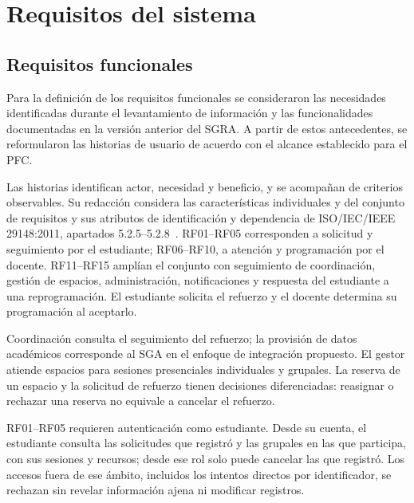 \section{Requisitos del sistema}
\subsection{Requisitos funcionales}
Para la definición de los requisitos funcionales se
consideraron las necesidades identificadas durante el
levantamiento de información y las funcionalidades
documentadas en la versión anterior del SGRA.
A partir de estos antecedentes, se reformularon las
historias de usuario de acuerdo con el alcance
establecido para el PFC.

Las historias identifican actor, necesidad y beneficio, y se acompañan
de criterios observables. Su redacción considera las características
individuales y del conjunto de requisitos y sus atributos de
identificación y dependencia de ISO/IEC/IEEE 29148:2011,
apartados 5.2.5--5.2.8~\cite{iso29148-2011}.
RF01--RF05 corresponden a solicitud y seguimiento por el estudiante;
RF06--RF10, a atención y programación por el docente.
RF11--RF15 amplían el conjunto con seguimiento de coordinación,
gestión de espacios, administración, notificaciones y respuesta
del estudiante a una reprogramación.
El estudiante solicita el refuerzo y el docente determina su
programación al aceptarlo.

Coordinación consulta el seguimiento del refuerzo; la provisión
de datos académicos corresponde al SGA en el enfoque de integración
propuesto. El gestor atiende espacios para sesiones presenciales
individuales y grupales. La reserva de un espacio y la solicitud
de refuerzo tienen decisiones diferenciadas: reasignar o rechazar
una reserva no equivale a cancelar el refuerzo.

RF01--RF05 requieren autenticación como estudiante. Desde su cuenta,
el estudiante consulta las solicitudes que registró y las grupales
en las que participa, con sus sesiones y recursos; desde ese
rol solo puede cancelar las que registró. Los accesos
fuera de ese ámbito, incluidos los intentos directos por identificador,
se rechazan sin revelar información ajena ni modificar registros.

